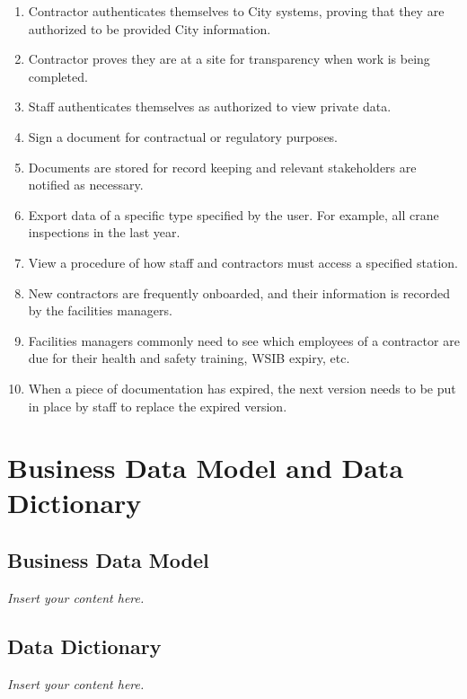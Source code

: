 \documentclass[12pt]{article}
\newcommand{\lips}{\textit{Insert your content here.}}
\begin{document}
\begin{enumerate}
\item Contractor authenticates themselves to City systems, proving that they 
are authorized to be provided City information.\\
\item Contractor proves they are at a site for transparency when work is being 
completed.\\
\item Staff authenticates themselves as authorized to view private data.\\
\item Sign a document for contractual or regulatory purposes.\\
\item Documents are stored for record keeping and relevant stakeholders 
are notified as necessary.\\
\item Export data of a specific type specified by the user. For example, all 
crane inspections in the last year.\\
\item View a procedure of how staff and contractors must access a specified 
station.\\
\item New contractors are frequently onboarded, and their information is 
recorded by the facilities managers.\\
\item Facilities managers commonly need to see which employees of a contractor 
are due for their health and safety training, WSIB expiry, etc.\\
\item When a piece of documentation has expired, the next version needs to be 
put in place by staff to replace the expired version.\\
\end{enumerate}

\section{Business Data Model and Data Dictionary}
\subsection{Business Data Model}
\lips
\subsection{Data Dictionary}
\lips
\end{document}
